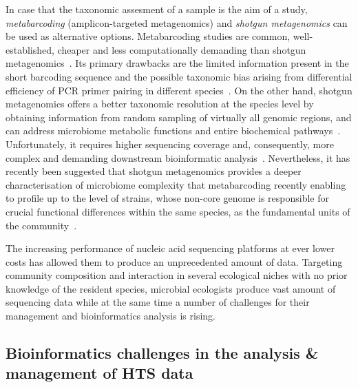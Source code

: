       In case that the taxonomic assesment of a sample is the aim of a study, 
      \textit{metabarcoding} (amplicon-targeted metagenomics) and \textit{shotgun metagenomics} can be used as alternative options. 
      Metabarcoding studies are common, well-established, cheaper and less computationally demanding than shotgun metagenomics~\cite{bell2021comparing}. 
      Its primary drawbacks are the limited information present in the short barcoding sequence and the possible taxonomic bias arising from differential efficiency of PCR primer pairing in different species~\cite{blazewicz2013evaluating}. 
      On the other hand, shotgun metagenomics offers a better taxonomic resolution at the species level by obtaining information from random sampling of virtually all genomic regions, and can address microbiome metabolic functions and entire biochemical pathways~\cite{sharpton2014introduction}. 
      Unfortunately, it requires higher sequencing coverage and, consequently, more complex and demanding downstream bioinformatic analysis~\cite{laudadio2018quantitative}. 
      Nevertheless, it has recently been suggested that shotgun metagenomics provides a deeper characterisation of microbiome complexity that metabarcoding recently enabling to profile up to the level of strains, whose non-core genome is responsible for crucial functional differences within the same species, as the fundamental units of the community~\cite{davila2019review, clooney2016comparing, segata2018road}.       
      
      The increasing performance of nucleic acid sequencing platforms at ever lower costs has allowed them to produce an unprecedented amount of data. 
      Targeting community composition and interaction in several ecological niches with no prior knowledge of the resident species, microbial ecologists produce vast 
      amount of sequencing data 
      while at the same time a number of challenges for their management and bioinformatics analysis is rising. 

      
      \subsection{Bioinformatics challenges in the analysis \& management of HTS data}

